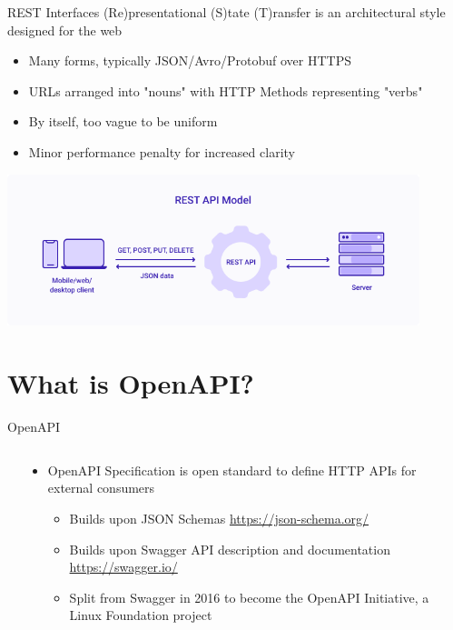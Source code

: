 \documentclass[bigger]{beamer}
\begin{document}
\begin{frame}[label={sec:org12a0ffb}]{REST Interfaces}
(Re)presentational (S)tate (T)ransfer is an architectural style designed for the web
\begin{itemize}
\item Many forms, typically JSON/Avro/Protobuf over HTTPS
\item URLs arranged into "nouns" with HTTP Methods representing "verbs"
\item By itself, too vague to be uniform
\item Minor performance penalty for increased clarity
\end{itemize}

\begin{center}
\includegraphics[width=12cm]{REST_API.png}
\end{center}
\end{frame}

\section{What is OpenAPI?}
\label{sec:org4c903cb}

\begin{frame}[label={sec:orgfbfe6ca}]{OpenAPI}
\begin{columns}
\begin{column}{0.25\columnwidth}
\begin{center}

\end{center}
\end{column}

\begin{column}{0.75\columnwidth}
\begin{itemize}
\item OpenAPI Specification is open standard to define HTTP APIs for external consumers
\begin{itemize}
\item Builds upon JSON Schemas \url{https://json-schema.org/}
\item Builds upon Swagger API description and documentation \url{https://swagger.io/}
\item Split from Swagger in 2016 to become the OpenAPI Initiative, a Linux Foundation project
\end{itemize}
\end{itemize}
\end{column}
\end{columns}
\end{frame}
\end{document}
